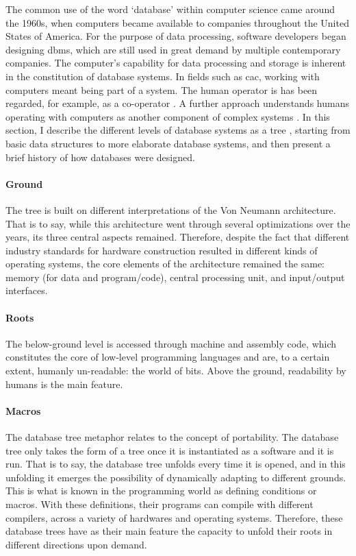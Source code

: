 The common use of the word `database' within computer science came around the 1960s, when computers became available to companies throughout the United States of America. For the purpose of data processing, software developers began designing \gls{dbms}, which are still used in great demand by multiple contemporary companies. The computer's capability for data processing and storage is inherent in the constitution of database systems. In fields such as \gls{cac}, working with computers meant being part of a system. The human operator is has been regarded, for example, as a co-operator \parencite{Mat63:The}. A further approach understands humans operating with computers as another component of complex systems \parencite{Vag01:Som}. In this section, I describe the different levels of database systems as a tree , starting from basic data structures to more elaborate database systems, and then present a brief history of how databases were designed.


\paragraph{Ground}
The tree is built on different interpretations of the Von Neumann architecture. That is to say, while this architecture went through several optimizations over the years, its three central aspects remained. Therefore, despite the fact that different industry standards for hardware construction resulted in different kinds of operating systems, the core elements of the architecture remained the same: memory (for data and program/code), central processing unit, and input/output interfaces.

\paragraph{Roots}
The below-ground level is accessed through machine and assembly code, which constitutes the core of low-level programming languages and are, to a certain extent, humanly un-readable: the world of bits. Above the ground, readability by humans is the main feature.

\paragraph{Macros}
\label{portability}
The database tree metaphor relates to the concept of portability. The database tree only takes the form of a tree once it is instantiated as a software and it is run. That is to say, the database tree unfolds every time it is opened, and in this unfolding it emerges the possibility of dynamically adapting to different grounds. This is what is known in the programming world as defining conditions or macros. With these definitions, their programs can compile with different compilers, across a variety of hardwares and operating systems. Therefore, these database trees have as their main feature the capacity to unfold their roots in different directions upon demand. 

